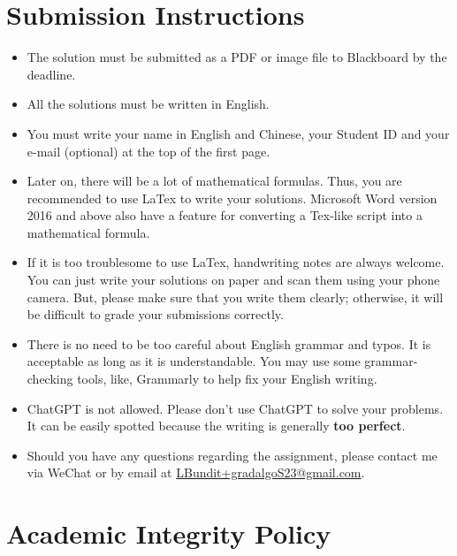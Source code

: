 \documentclass[11pt,letterpaper]{article}
\begin{document}
\section*{Submission Instructions}

\begin{itemize}
	
	\item The solution must be submitted as a PDF or image file to Blackboard by the deadline.
	
	\item All the solutions must be written in English.
	
	\item You must write your name in English and Chinese, your Student ID and your e-mail (optional) at the top of the first page. 

	\item Later on, there will be a lot of mathematical formulas. Thus, you are recommended to use LaTex to write your solutions. Microsoft Word version 2016 and above also have a feature for converting a Tex-like script into a mathematical formula. 

	\item If it is too troublesome to use LaTex, handwriting notes are always welcome. You can just write your solutions on paper and scan them using your phone camera. But, please make sure that you write them clearly; otherwise, it will be difficult to grade your submissions correctly. 

	\item  There is no need to be too careful about English grammar and typos. It is acceptable as long as it is understandable. You may use some grammar-checking tools, like, Grammarly to help fix your English writing. 
	
	\item ChatGPT is not allowed. Please don’t use ChatGPT to solve your problems. It can be easily spotted because the writing is generally {\bf too perfect}. 

	\item Should you have any questions regarding the assignment, please contact me via WeChat or by email at \url{LBundit+gradalgoS23@gmail.com}.

\end{itemize}


\section*{Academic Integrity Policy}
\end{document}
